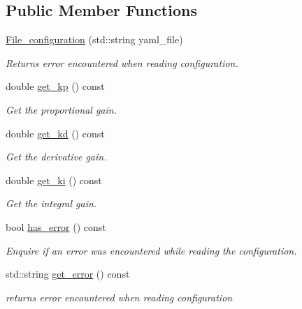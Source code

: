 \subsection*{Public Member Functions}
\begin{DoxyCompactItemize}
\item 
\hyperlink{classci__example__cpp_1_1File__configuration_a9eb17de315392f3f755a327af4beb5d7}{File\+\_\+configuration} (std\+::string yaml\+\_\+file)
\begin{DoxyCompactList}\small\item\em Returns error encountered when reading configuration. \end{DoxyCompactList}\item 
double \hyperlink{classci__example__cpp_1_1File__configuration_a5d051da802569c36feeab2b1fbf9a09a}{get\+\_\+kp} () const
\begin{DoxyCompactList}\small\item\em Get the proportional gain. \end{DoxyCompactList}\item 
double \hyperlink{classci__example__cpp_1_1File__configuration_a14b1e36766d55ee0132a78fbc41f8096}{get\+\_\+kd} () const
\begin{DoxyCompactList}\small\item\em Get the derivative gain. \end{DoxyCompactList}\item 
double \hyperlink{classci__example__cpp_1_1File__configuration_a6e338977105cbcf8b822892d1feb9006}{get\+\_\+ki} () const
\begin{DoxyCompactList}\small\item\em Get the integral gain. \end{DoxyCompactList}\item 
bool \hyperlink{classci__example__cpp_1_1File__configuration_aa3cae137be3b59e61d13c2a9b1ec8b6a}{has\+\_\+error} () const
\begin{DoxyCompactList}\small\item\em Enquire if an error was encountered while reading the configuration. \end{DoxyCompactList}\item 
std\+::string \hyperlink{classci__example__cpp_1_1File__configuration_aaf67f7d61d467563a4dce8aa69306a6a}{get\+\_\+error} () const
\begin{DoxyCompactList}\small\item\em returns error encountered when reading configuration \end{DoxyCompactList}\end{DoxyCompactItemize}
